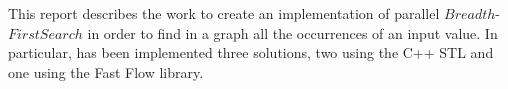This report describes the work to create an implementation of parallel $Breadth$-$First Search$ in order to find in a graph all the occurrences of an input value. In particular, has been implemented three solutions, two using the C++ STL and one using the Fast Flow library.